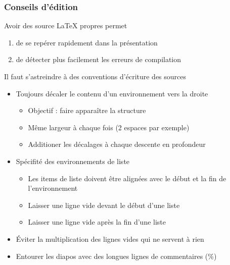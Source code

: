 
\begin{frame}[fragile]
  \frametitle{Conseils d'édition}

  Avoir des source \LaTeX{} propres permet 

  \begin{enumerate}
  \item de se repérer rapidement dans la présentation
  \item de détecter plus facilement les erreurs de compilation
  \end{enumerate}

  \alert{Il faut s'astreindre à des conventions d'écriture des sources}

  \pause

  \begin{itemize}
  \item Toujours décaler le contenu d'un environnement vers la droite

    \begin{itemize}
    \item Objectif : faire apparaître la structure
    \item Même largeur à chaque fois (2 espaces par exemple)
    \item Additioner les décalages à chaque descente en profondeur      
    \end{itemize}

  \item Spécifité des environnements de liste

    \begin{itemize}
    \item Les items de liste doivent être alignées avec le début et la fin de l'environnement
    \item Laisser une ligne vide devant le début d'une liste
    \item Laisser une ligne vide après la fin d'une liste
    \end{itemize}

  \item Éviter la multiplication des lignes vides qui ne servent à rien
  \item Entourer les diapos avec des longues lignes de commentaires (\%)
  \end{itemize}
\end{frame}

